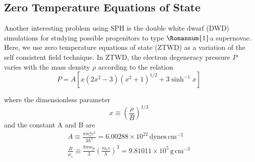 \documentclass[notes.tex]{subfiles}
\begin{document}
\subsection{Zero Temperature Equations of State}
Another interesting problem using SPH is the double white dwarf (DWD) simulations for studying possible progenitors to type $\Romannum{1}$a supernovae. Here, we use zero temperature equations of state (ZTWD) as a variation of the self consistent field technique. In ZTWD, the electron degeneracy pressure $P$ varies with the mass density $\rho$ according to the relation
\begin{equation}
P = A \left[ x(2x^2-3)(x^2+1)^{1/2} + 3 \sinh^{-1} x \right]
\end{equation}

where the dimensionless parameter
\begin{equation}
x \equiv \left( \frac{\rho}{B} \right)^{1/3}
\end{equation}
and the constant A and B are
\begin{align}
A \equiv \frac{\pi m_e^4 c^5}{3h^3} = 6.00288 \times 10^{22} \, \text{dynes} \, \text{cm}^{-2} \\
\frac{B}{\mu_e} \equiv \frac{8 \pi m_p}{3} \left(\frac{m_e c}{h} \right)^3 = 9.81011 \times 10^5 \, \text{g} \, \text{cm}^{-3}
\end{align}
\end{document}
